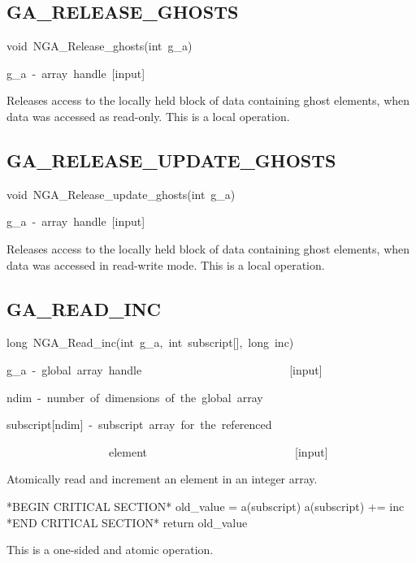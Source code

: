 \subsection*{\label{sub:GA_RELEASE_GHOSTS}GA\_RELEASE\_GHOSTS}
\begin{lyxcode}
void~NGA\_Release\_ghosts(int~g\_a)



g\_a~-~array~handle~{[}input{]}
\end{lyxcode}
Releases access to the locally held block of data containing ghost
elements, when data was accessed as read-only. This is a local operation. 


\subsection*{\label{sub:GA_RELEASE_UPDATE_GHOSTS}GA\_RELEASE\_UPDATE\_GHOSTS}
\begin{lyxcode}
void~NGA\_Release\_update\_ghosts(int~g\_a)



g\_a~-~array~handle~{[}input{]}
\end{lyxcode}
Releases access to the locally held block of data containing ghost
elements, when data was accessed in read-write mode. This is a local
operation. 


\subsection*{\label{sub:GA_READ_INC}GA\_READ\_INC}
\begin{lyxcode}
long~NGA\_Read\_inc(int~g\_a,~int~subscript{[}{]},~long~inc)



g\_a~-~global~array~handle~~~~~~~~~~~~~~~~~~~~~~~~~~{[}input{]}~

ndim~-~number~of~dimensions~of~the~global~array~

subscript{[}ndim{]}~-~subscript~array~for~the~referenced~

~~~~~~~~~~~~~~~~~~element~~~~~~~~~~~~~~~~~~~~~~~~~~{[}input{]}
\end{lyxcode}
Atomically read and increment an element in an integer array.

{*}BEGIN CRITICAL SECTION{*} old\_value = a(subscript) a(subscript)
+= inc {*}END CRITICAL SECTION{*} return old\_value

This is a one-sided and atomic operation. 


